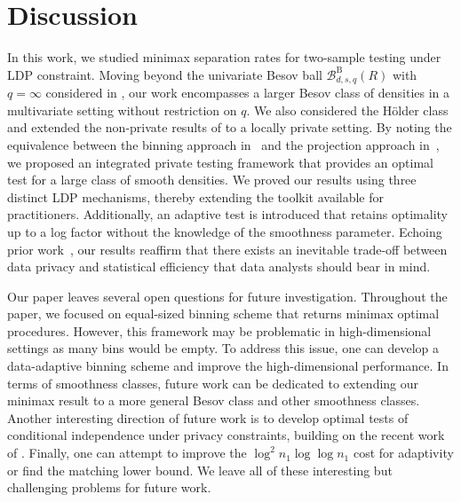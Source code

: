 \documentclass[twoside,11pt]{article}
\newcommand{\dimDensity}{d} %
\newcommand{\smoothness}{s}
\newcommand{\ballRadius}{R}
\newcommand{\besovParamNorm}{p}
\newcommand{\besovParamMicroscope}{q}
\newcommand{\ballDistn}{\mathcal{B}}
\newcommand{\besovBall}[2]{\ballDistn_{\dimDensity,\smoothness, #2}^{\mathrm{B}}(\ballRadius)}
\begin{document}
%

\section{Discussion}
In this work, we studied minimax separation rates for two-sample testing under LDP constraint. Moving beyond the univariate Besov ball $\besovBall{\besovParamNorm}{\besovParamMicroscope}$ with $q=\infty$ considered in \citet{Lam-Weil2021MinimaxConstraint}, our work encompasses a larger Besov class of densities in a multivariate setting without restriction on $q$. We also considered the H\"{o}lder class and extended the non-private results of \citet{kim_minimax_2022} to a locally private setting. By noting the equivalence between the binning approach in~\citet{kim_minimax_2022} and the projection approach in~\citet{Lam-Weil2021MinimaxConstraint}, we proposed an integrated private testing framework that provides an optimal test for a large class of smooth densities. We proved our results using three distinct LDP mechanisms, thereby extending the toolkit available for practitioners. Additionally, an adaptive test is introduced that retains optimality up to a log factor without the knowledge of the smoothness parameter. Echoing prior work~\citep{Aliakbarpour2018DPgof, Aliakbarpour2019PrivatePermutations, Cai2017DPGofPrivit, Lam-Weil2021MinimaxConstraint}, our results reaffirm that there exists an inevitable trade-off between data privacy and statistical efficiency that data analysts should bear in mind.

Our paper leaves several open questions for future investigation. Throughout the paper, we focused on equal-sized binning scheme that returns minimax optimal procedures. However, this framework may be problematic in high-dimensional settings as many bins would be empty. To address this issue, one can develop a data-adaptive binning scheme and improve the high-dimensional performance. In terms of smoothness classes, future work can be dedicated to extending our minimax result to a more general Besov class and other smoothness classes. Another interesting direction of future work is to develop optimal tests of conditional independence under privacy constraints, building on the recent work of \cite{neykov2021minimax,kim2022local}. Finally, one can attempt to improve the $\log^2 n_1 \log \log n_1$ cost for adaptivity or find the matching lower bound. We leave all of these interesting but challenging problems for future work.
\end{document}
